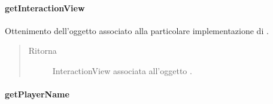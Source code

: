 \documentclass[letterpaper,10pt,italian,openany,oneside]{sphinxmanual}
\begin{document}
\paragraph{getInteractionView}
\label{\detokenize{source/it/unicam/cs/pa/mastermind/ui/StartView:getinteractionview}}

\begin{fulllineitems}
\label{\detokenize{source/it/unicam/cs/pa/mastermind/ui/StartView:it.unicam.cs.pa.mastermind.ui.StartView.getInteractionView()}}
Ottenimento dell’oggetto  associato alla particolare implementazione di .
\begin{quote}\begin{description}
\item[{Ritorna}] \leavevmode
InteractionView associata all’oggetto .

\end{description}\end{quote}

\end{fulllineitems}



\paragraph{getPlayerName}
\label{\detokenize{source/it/unicam/cs/pa/mastermind/ui/StartView:getplayername}}
\end{document}
